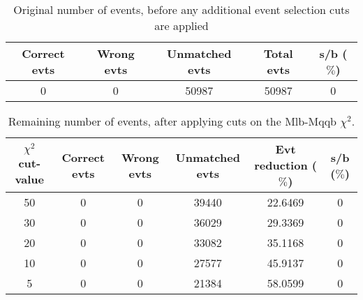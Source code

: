 \documentclass{article}
\begin{document}
 

 \begin{abstract} 
 
   The tables in this document represent the influence of the additional event selection cuts that were applied in order to reduce the number of selected events for CPU reasons. \\ 
   The considered cuts are rather basic and are merely developed to reduce the number of so-called wrong events \\ 
   \begin{itemize} 
     \item Cut on Mlb-Mqqb $\chi^{2}$ distribution 
     \item Cut on top and W-mass window 
   \end{itemize} 
 
   \textbf{Created on :} \today 
 \end{abstract} 
 
 \begin{table}[h!t] 
  \caption{Original number of events, before any additional event selection cuts are applied} 
  \centering 
   \begin{tabular}{c|c|c|c|c} 
     Correct evts    & Wrong evts     & Unmatched evts      &  Total evts & s/b ($\%$)     \\ 
     \hline
     0   &   0  & 50987 & 50987  & 0 
 
   \end{tabular} 
 \end{table} 
 
 \begin{table}[h!t] 
  \caption{Remaining number of events, after applying cuts on the Mlb-Mqqb $\chi^{2}$.} 
  \centering 
   \begin{tabular}{c|c|c|c|c|c} 
     $\chi^{2}$ cut-value    & Correct evts    & Wrong evts     & Unmatched evts  & Evt reduction ($\%$)    & s/b ($\%$)     \\ 
     \hline
     50  &   0  &  0  &  39440  &  22.6469 & 0 \\ 
     30  &   0  &  0  &  36029  &  29.3369 & 0 \\ 
     20  &   0  &  0  &  33082  &  35.1168 & 0 \\ 
     10  &   0  &  0  &  27577  &  45.9137 & 0 \\ 
     5  &   0  &  0  &  21384  &  58.0599 & 0   \end{tabular} 
 \end{table} 
 
\end{document}
